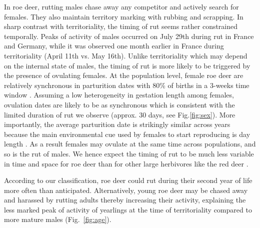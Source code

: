 \documentclass[a4paper,11pt]{article}
\begin{document}
In roe deer, rutting males chase away any competitor and actively search for females. They also maintain territory marking with rubbing and scrapping. In sharp contrast with territoriality, the timing of rut seems rather constrained temporally. Peaks of activity of males occurred on July 29th during rut in France and Germany, while it was observed one month earlier in France during territoriality (April 11th vs. May 16th). Unlike territoriality which may depend on the internal state of males, the timing of rut is more likely to be triggered by the presence of ovulating females. At the population level, female roe deer are relatively synchronous in parturition dates with 80\% of births in a 3-weeks time window \citep{plard_parturition_2013}. Assuming a low heterogeneity in gestation length among females, ovulation dates are likely to be as synchronous which is consistent with the limited duration of rut we observe (approx. 30 days, see Fig.\ref{fig:sex}). More importantly, the average parturition date is strikingly similar across years because the main environmental cue used by females to start reproducing is day length \citep{plard_mismatch_2014}. As a result females may ovulate at the same time across populations, and so is the rut of males. We hence expect the timing of rut to be much less variable in time and space for roe deer than for other large herbivores like the red deer \citep[\textit{e.g.}][]{bonenfant_multiple_2004}.

According to our classification, roe deer could rut during their second year of life more often than anticipated. Alternatively, young roe deer may be chased away and harassed by rutting adults thereby increasing their activity, explaining the less marked peak of activity of yearlings at the time of territoriality compared to more mature males (Fig.~\ref{fig:age}).



\end{document}
